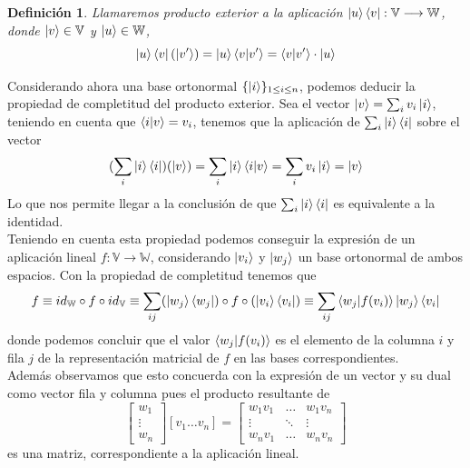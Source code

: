 \documentclass[a4paper]{article}
\newtheorem{deff}{Definición}[section]
\numberwithin{equation}{section}
\begin{document}
\begin{deff}Llamaremos producto exterior a la aplicación $\ket{u}\bra{v}: \mathbb{V} \longrightarrow \mathbb{W}$, donde $\ket{v} \in \mathbb{V}$ y $\ket{u} \in \mathbb{W}$,
\begin{equation}
\ket{u}\bra{v}(\ket{v'}) = \ket{u}\braket{v|v'} = \braket{v|v'} \cdot \ket{u}
\end{equation}
\end{deff}
Considerando ahora una base ortonormal $\{\ket{i}\}_{1\leq i\leq n}$, podemos deducir la propiedad de completitud del producto exterior. Sea el vector $\ket{v} = \sum_i v_i\ket{i}$, teniendo en cuenta que $\braket{i|v} = v_i$, tenemos que la aplicación de $\sum_i \ket{i}\bra{i}$ sobre el vector
\begin{equation}
(\sum_i \ket{i}\bra{i}) (\ket{v}) = \sum_i \ket{i}\braket{i|v} = \sum_i v_i \ket{i} = \ket{v}
\end{equation}
Lo que nos permite llegar a la conclusión de que $\sum_i \ket{i}\bra{i}$ es equivalente a la identidad.
\\
Teniendo en cuenta esta propiedad podemos conseguir la expresión de un aplicación lineal $f: \mathbb{V} \longrightarrow \mathbb{W}$, considerando $\ket{v_i}$ y $\ket{w_j}$ un base ortonormal de ambos espacios. Con la propiedad de completitud tenemos que
\begin{equation}
f \equiv id_{\mathbb{W}} \circ f \circ id_{\mathbb{V}} \equiv
\sum_{ij} (\ket{w_j}\bra{w_j}) \circ f \circ (\ket{v_i}\bra{v_i}) \equiv \sum_{ij} \braket{w_j|f(v_i)} \ket{w_j}\bra{v_i}
\end{equation}
donde podemos concluir que el valor $\braket{w_j|f(v_i)}$ es el elemento de la columna $i$ y fila $j$ de la representación matricial de $f$ en las bases correspondientes.
\\
Además observamos que esto concuerda con la expresión de un vector y su dual como vector fila y columna pues el producto resultante de
\begin{equation}
\begin{bmatrix}
w_1 \\ \vdots \\ w_n
\end{bmatrix}
\left[ v_1 \ldots v_n \right]
= \begin{bmatrix}
w_1 v_1 & \ldots & w_1 v_n \\
\vdots & \ddots & \vdots \\
w_n v_1 & \ldots & w_n v_n
\end{bmatrix}
\end{equation} es una matriz, correspondiente a la aplicación lineal.
\end{document}

